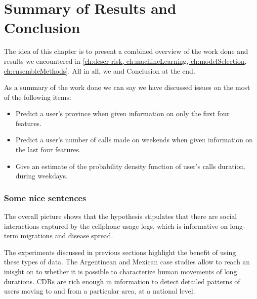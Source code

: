 
\chapter{Summary of Results and Conclusion}\label{ch:results_conclusion}


The idea of this chapter is to present a combined overview of the work done and results we encountered in \cref{ch:descr-risk, ch:machineLearning, ch:modelSelection, ch:ensembleMethods}. All in all, we
 and Conclusion at the end.

As a summary of the work done we can say we have discussed issues on the most of the following items:



\begin{itemize}
    \item
    Predict a user's province when given information on only the first four features.
    \item Predict a user's number of calls made on weekends when given information on the last four features.
    \item Give an estimate of the probability density function of user's calls duration, during weekdays.
\end{itemize}



\subsection{Some nice sentences}



The overall picture shows that the hypothesis stipulates that there are social interactions captured by the cellphone usage logs, which is informative on long-term migrations and disease spread.


The experiments discussed in previous sections highlight the benefit of using these types of data.
The Argentinean and Mexican case studies allow to reach an inisght on to whether it is possible to characterize human movements of long durations.
CDRs are rich enough in information to detect detailed patterns of users moving to and from a particular area, at a national level.



